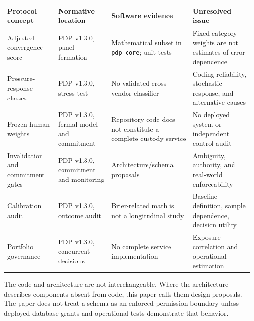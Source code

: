 \documentclass[
  english,
]{article}
\newcounter{none} %
\begin{document}
{\def\LTcaptype{none} %
\begin{longtable}[]{@{}
  >{\raggedright\arraybackslash}p{}
  >{\raggedright\arraybackslash}p{}
  >{\raggedright\arraybackslash}p{}
  >{\raggedright\arraybackslash}p{}@{}}
\toprule\noalign{}
\begin{minipage}[b]{\linewidth}\raggedright
Protocol concept
\end{minipage} & \begin{minipage}[b]{\linewidth}\raggedright
Normative location
\end{minipage} & \begin{minipage}[b]{\linewidth}\raggedright
Software evidence
\end{minipage} & \begin{minipage}[b]{\linewidth}\raggedright
Unresolved issue
\end{minipage} \\
\midrule\noalign{}
\endhead
\bottomrule\noalign{}
\endlastfoot
Adjusted convergence score & PDP v1.3.0, panel formation & Mathematical
subset in \texttt{pdp-core}; unit tests & Fixed category weights are not
estimates of error dependence \\
Pressure-response classes & PDP v1.3.0, stress test & No validated
cross-vendor classifier & Coding reliability, stochastic response, and
alternative causes \\
Frozen human weights & PDP v1.3.0, formal model and commitment &
Repository code does not constitute a complete custody service & No
deployed system or independent control audit \\
Invalidation and commitment gates & PDP v1.3.0, commitment and
monitoring & Architecture/schema proposals & Ambiguity, authority, and
real-world enforceability \\
Calibration audit & PDP v1.3.0, outcome audit & Brier-related math is
not a longitudinal study & Baseline definition, sample dependence,
decision utility \\
Portfolio governance & PDP v1.3.0, concurrent decisions & No complete
service implementation & Exposure correlation and operational
estimation \\
\end{longtable}
}

The code and architecture are not interchangeable. Where the
architecture describes components absent from code, this paper calls
them design proposals. The paper does not treat a schema as an enforced
permission boundary unless deployed database grants and operational
tests demonstrate that behavior.
\end{document}
